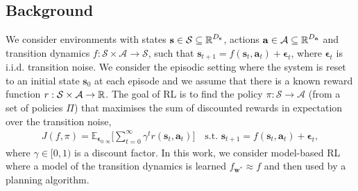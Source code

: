\documentclass{article}
\newcommand{\state}{\ensuremath{\mathbf{s}}}
\newcommand{\action}{\ensuremath{\mathbf{a}}}
\newcommand{\noise}{\ensuremath{\bm\epsilon}}
\newcommand{\discount}{\ensuremath{\gamma}}
\newcommand{\stateDomain}{\ensuremath{\mathcal{S}}}
\newcommand{\actionDomain}{\ensuremath{\mathcal{A}}}
\newcommand{\policyDomain}{\ensuremath{\Pi}}
\newcommand{\rewardFn}{\ensuremath{r}}
\newcommand{\transitionFn}{\ensuremath{f}}
\newcommand{\policy}{\ensuremath{\pi}}
\begin{document}
\subsection{Background}
We consider environments with states \(\state \in \stateDomain \subseteq \R^{D_{\state}} \),
actions \(\action \in \actionDomain \subseteq \R^{D_{\action}}\) and transition dynamics
\(\transitionFn: \stateDomain \times \actionDomain \rightarrow \stateDomain \), such that
$\state_{t+1} = \transitionFn(\state_{t}, \action_{t}) + \noise_{t}$, where  $\noise_{t}$
is i.i.d. transition noise.
We consider the episodic setting where the system is reset to an initial state $\state_{0}$ at each episode and we
assume that there is a known reward function $r : \stateDomain \times \actionDomain \rightarrow \R$.
The goal of RL is to find the policy \(\pi : \stateDomain \rightarrow \actionDomain\)
(from a set of policies $\Pi$) that maximises the sum of discounted rewards
in expectation over the transition noise,
\begin{align} \label{eq-model-free-objective}
J(\transitionFn, \policy) = \mathbb{E}_{\noise_{0:\infty}} \bigg[ \sum_{t=0}^{\infty} \discount^{t} \rewardFn(\state_{t},\action_{t}) \bigg]
\quad \text{s.t. } \state_{t+1} = \transitionFn(\state_{t}, \action_{t}) + \noise_{t},
\end{align}
where $\gamma \in [0, 1)$ is a discount factor.
In this work, we consider model-based RL where a model of the transition dynamics is learned \(f_{\mathbf{w}^{*}} \approx \transitionFn\) and then used by a planning algorithm.
\end{document}
